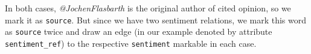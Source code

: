 \documentclass[11pt,a4paper]{article}
\theoremstyle{mytheoremstyle}
\begin{document}
In both cases, \textit{@JochenFlasbarth} is the original author of
cited opinion, so we mark it as \texttt{source}.  But since we have
two sentiment relations, we mark this word as \texttt{source} twice
and draw an edge (in our example denoted by attribute
\texttt{sentiment\_ref}) to the respective \texttt{sentiment} markable
in each case.
\end{document}
